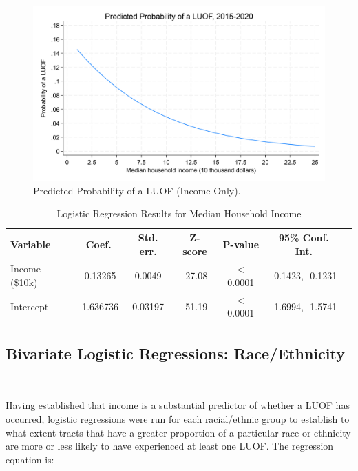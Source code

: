 \documentclass[12pt]{article}
\begin{document}
\begin{figure}[H]
  \centering %
  \includegraphics[width=\linewidth]{images/LUOF_logit_income_only}
  \captionsetup{justification=centering, singlelinecheck=false, margin=2cm}
  \caption[Predicted Probability of a LUOF (Income Only)]{Predicted Probability of a LUOF (Income Only).}
  \label{fig:logit_income_plot}
\end{figure}

\begin{table}[ht]
\centering
\begin{tabular}{lcccccc}
\toprule
\textbf{Variable} & \textbf{Coef.} & \textbf{Std. err.} & \textbf{Z-score} & \textbf{P-value} & \textbf{95\% Conf. Int.} \\
\midrule
Income (\$10k) & -0.13265 & 0.0049 & -27.08 & $<$0.0001 & -0.1423, -0.1231 \\
Intercept & -1.636736 & 0.03197 & -51.19 & $<$0.0001 & -1.6994, -1.5741 \\
\bottomrule
\end{tabular}
\caption{Logistic Regression Results for Median Household Income}
\label{tab:income_logit}
\end{table}

\subsection{Bivariate Logistic Regressions: Race/Ethnicity}\

Having established that income is a substantial predictor of whether a LUOF has occurred, logistic regressions were run for each racial/ethnic group to establish to what extent tracts that have a greater proportion of a particular race or ethnicity are more or less likely to have experienced at least one LUOF. The regression equation is:
\end{document}
